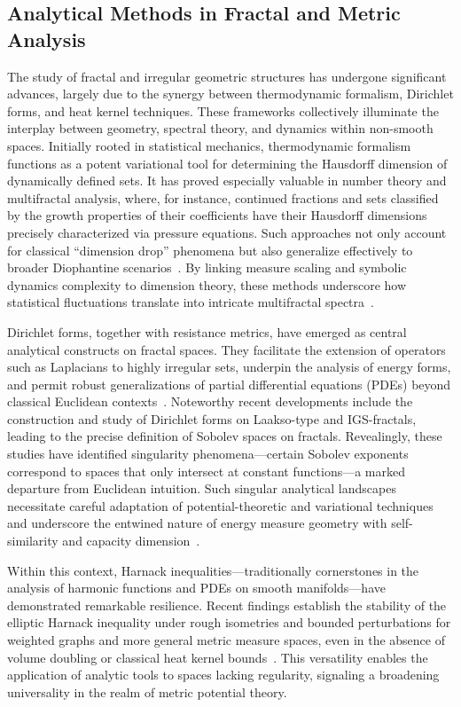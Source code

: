 \documentclass[sigconf]{acmart}
\begin{document}
\subsection{Analytical Methods in Fractal and Metric Analysis}

The study of fractal and irregular geometric structures has undergone significant advances, largely due to the synergy between thermodynamic formalism, Dirichlet forms, and heat kernel techniques. These frameworks collectively illuminate the interplay between geometry, spectral theory, and dynamics within non-smooth spaces. Initially rooted in statistical mechanics, thermodynamic formalism functions as a potent variational tool for determining the Hausdorff dimension of dynamically defined sets. It has proved especially valuable in number theory and multifractal analysis, where, for instance, continued fractions and sets classified by the growth properties of their coefficients have their Hausdorff dimensions precisely characterized via pressure equations. Such approaches not only account for classical ``dimension drop'' phenomena but also generalize effectively to broader Diophantine scenarios~\cite{ref13}. By linking measure scaling and symbolic dynamics complexity to dimension theory, these methods underscore how statistical fluctuations translate into intricate multifractal spectra~\cite{ref9}.

Dirichlet forms, together with resistance metrics, have emerged as central analytical constructs on fractal spaces. They facilitate the extension of operators such as Laplacians to highly irregular sets, underpin the analysis of energy forms, and permit robust generalizations of partial differential equations (PDEs) beyond classical Euclidean contexts~\cite{ref43,ref51,ref40}. Noteworthy recent developments include the construction and study of Dirichlet forms on Laakso-type and IGS-fractals, leading to the precise definition of Sobolev spaces on fractals. Revealingly, these studies have identified singularity phenomena---certain Sobolev exponents correspond to spaces that only intersect at constant functions---a marked departure from Euclidean intuition. Such singular analytical landscapes necessitate careful adaptation of potential-theoretic and variational techniques and underscore the entwined nature of energy measure geometry with self-similarity and capacity dimension~\cite{ref43,ref40}.

Within this context, Harnack inequalities---traditionally cornerstones in the analysis of harmonic functions and PDEs on smooth manifolds---have demonstrated remarkable resilience. Recent findings establish the stability of the elliptic Harnack inequality under rough isometries and bounded perturbations for weighted graphs and more general metric measure spaces, even in the absence of volume doubling or classical heat kernel bounds~\cite{ref38}. This versatility enables the application of analytic tools to spaces lacking regularity, signaling a broadening universality in the realm of metric potential theory.
\end{document}

